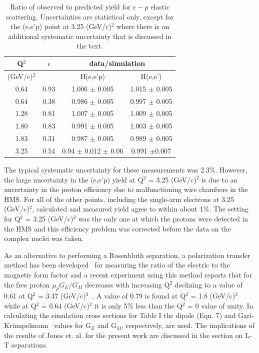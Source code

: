 \documentclass[aps,prl,twocolumn,showpacs,amsmath,amssymb,floats]{revtex4}
\begin{document}
\begin{table}
\caption{Ratio of observed to predicted yield for $e-p$ elastic scattering.  
Uncertainties are statistical only, except for the (e,e'p) point at 3.25 
(GeV/c)$^2$ where there is an additional systematic uncertainty that is discussed 
in the text.} 
\label{hydrorat}
\begin{center}
\begin{tabular}{|c|c|c|c|} \hline \hline
        Q$^2$  & $\epsilon$ & \multicolumn{2}{c}{data/simulation}  \vline\\ \hline
    (GeV/c)$^2$  &            &   H(e,e'p) &   H(e,e')  \\ \hline                     
0.64      &  0.93      &   1.006 $\pm$ 0.005 & 1.015 $\pm$ 0.005 \\
     0.64      &  0.38      &   0.986 $\pm$ 0.005 & 0.997 $\pm$ 0.005 \\
     1.28      &  0.81      &   1.007 $\pm$ 0.005 & 1.009 $\pm$ 0.005 \\
     1.80      &  0.83      &   0.991 $\pm$ 0.005 & 1.003 $\pm$ 0.005 \\
     1.83      &  0.31      &   0.987 $\pm$ 0.005 & 0.989 $\pm$ 0.005 \\
     3.25      &  0.54      &   0.94  $\pm$ 0.012 $\pm$ 0.06 & 0.991 $\pm$0.007 
\\ \hline \hline
\end{tabular}
\end{center}
\end{table}

The typical systematic uncertainty for these measurements was 2.3\%. However, the
 large uncertainty in the (e,e'p) yield at Q$^2$ = 3.25 (GeV/c)$^2$ is due to 
an uncertainty in the proton efficiency due to malfunctioning wire chambers 
in the HMS.  For all of the other points, including the single-arm 
electrons at 3.25 (GeV/c)$^2$, calculated and measured yield agree to within 
about 1\%.  The setting for Q$^2$ = 3.25 (GeV/c)$^2$  was the only one at which 
the protons were detected in the HMS and this efficiency problem was corrected 
before the data on the complex nuclei was taken.
 
As an alternative to performing a Rosenbluth separation, a polarization transfer 
method has been developed~\cite{acg81} for measuring the ratio of the electric 
to the magnetic form factor and a recent experiment using this method reports 
that for the free proton  $\mu_{p}G_E/G_M$ decreases with increasing Q$^2$ 
declining to a value of 0.61 at Q$^2$ = 3.47 (GeV/c)$^2$~\cite{mjones00}.  A 
value of 0.79 is found at Q$^2$ = 1.8 (GeV/c)$^2$ while at Q$^2$ = 0.64 
(GeV/c)$^2$ it is only 5\% less than the
Q$^2$ = 0 value of unity.  In calculating the simulation cross sections for 
Table I the dipole (Eqn. 7) and Gari-Kr\"{u}mpelmann~\cite{gk73} values for G$_E$ 
and G$_M$, respectively, are used.  The implications of the results of Jones et. 
al. \cite{mjones00} for the present work are discussed in the section on L-T 
separations.  
 
\end{document}
